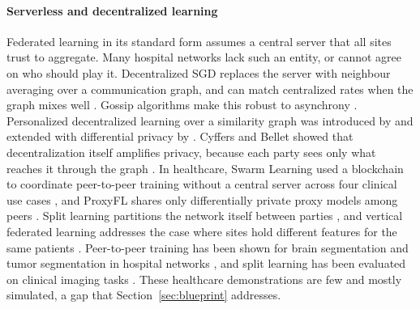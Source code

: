 \documentclass[acmsmall,screen,review]{acmart}
\theoremstyle{acmdefinition}
\begin{document}
\paragraph{Serverless and decentralized learning} Federated learning in its standard form assumes a central server that all sites trust to aggregate. Many hospital networks lack such an entity, or cannot agree on who should play it. Decentralized SGD replaces the server with neighbour averaging over a communication graph, and can match centralized rates when the graph mixes well \cite{koloskova2020unified,lian2017can,nedic2009distributed}. Gossip algorithms make this robust to asynchrony \cite{boyd2006randomized,xiao2004fast}. Personalized decentralized learning over a similarity graph was introduced by \citet{vanhaesebrouck2017decentralized} and extended with differential privacy by \citet{bellet2018personalized}. Cyffers and Bellet showed that decentralization itself amplifies privacy, because each party sees only what reaches it through the graph \cite{cyffers2022privacy}. In healthcare, Swarm Learning used a blockchain to coordinate peer-to-peer training without a central server across four clinical use cases \cite{warnatherresthal2021swarm}, and ProxyFL shares only differentially private proxy models among peers \cite{kalra2023decentralized}. Split learning partitions the network itself between parties \cite{gupta2018distributed,vepakomma2018split}, and vertical federated learning addresses the case where sites hold different features for the same patients \cite{yang2019federated}. Peer-to-peer training has been shown for brain segmentation \cite{roy2019braintorrent} and tumor segmentation in hospital networks \cite{tedeschini2022decentralized}, and split learning has been evaluated on clinical imaging tasks \cite{poirot2019split}. These healthcare demonstrations are few and mostly simulated, a gap that Section~\ref{sec:blueprint} addresses.
\end{document}
